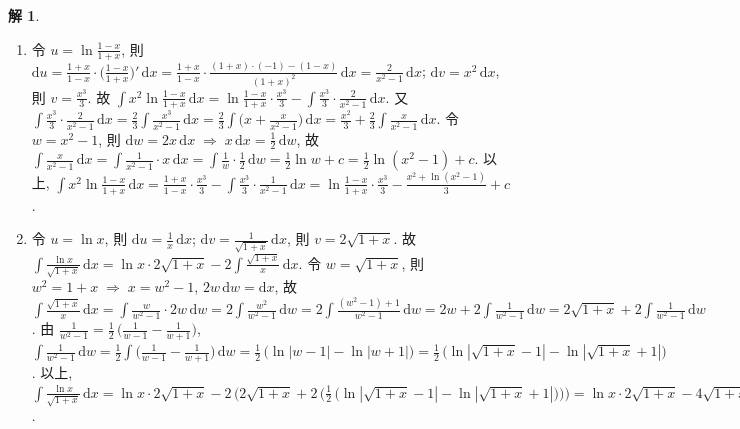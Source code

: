 \documentclass[12pt]{extarticle}
\newcommand{\ds}{\displaystyle}
\newcommand{\ie}{\;\Longrightarrow\;}
\theoremstyle{definition}
\newtheorem*{sol}{解}
\begin{document}
\begin{sol}
\begin{enumerate}
    \item 令 $\ds u = \ln\frac{1 - x}{1 + x}$, 則 $\ds\text{d}u = \frac{1 + x}{1 - x}\cdot\Big(\frac{1 - x}{1 + x}\Big)'\,\text{d}x = \frac{1 + x}{1 - x}\cdot\frac{(1 + x)\cdot(-1)-(1 - x)}{(1 + x)^2}\,\text{d}x = \frac{2}{x^2 - 1}\,\text{d}x$; $\ds\text{d}v = x^2\,\text{d}x$, 則 $\ds v = \frac{x^3}{3}$. 故 $\ds\int\!x^2\ln\frac{1 - x}{1 + x}\,\text{d}x = \ln\frac{1 - x}{1 + x}\cdot\frac{x^3}{3} - \int\frac{x^3}{3}\cdot\frac{2}{x^2 - 1}\,\text{d}x$. 又 $\ds\int\frac{x^3}{3}\cdot\frac{2}{x^2 - 1}\,\text{d}x = \frac{2}{3}\int\!\frac{x^3}{x^2 - 1}\,\text{d}x = \frac{2}{3}\int\!\Big(x + \frac{x}{x^2 - 1}\Big)\,\text{d}x = \frac{x^2}{3} + \frac{2}{3}\int\!\frac{x}{x^2 - 1}\,\text{d}x$. 令 $\ds w = x^2 - 1$, 則 $\ds\text{d}w = 2x\,\text{d}x\ie x\,\text{d}x = \frac{1}{2}\,\text{d}w$, 故 $\ds\int\!\frac{x}{x^2 - 1}\,\text{d}x = \int\!\frac{1}{x^2 - 1}\cdot x\,\text{d}x = \int\!\frac{1}{w}\cdot\frac{1}{2}\,\text{d}w = \frac{1}{2}\ln w + c = \frac{1}{2}\ln(x^2 - 1) + c$. 以上, $\ds\int x^2\ln\frac{1 - x}{1 + x}\,\text{d}x = \frac{1 + x}{1 - x}\cdot\frac{x^3}{3} - \int\!\frac{x^3}{3}\cdot\frac{1}{x^2 - 1}\,\text{d}x = \ln\frac{1 - x}{1 + x}\cdot\frac{x^3}{3} - \frac{x^2 + \ln(x^2 - 1)}{3} + c$. 
    \item 令 $\ds u = \ln x$, 則 $\ds\text{d}u = \frac{1}{x}\,\text{d}x$; $\ds\text{d}v = \frac{1}{\sqrt{1 + x}}\,\text{d}x$, 則 $\ds v = 2\sqrt{1 + x}$. 故 $\ds\int\!\frac{\ln x}{\sqrt{1 + x}}\,\text{d}x = \ln x\cdot 2\sqrt{1 + x} - 2 \int\!\frac{\sqrt{1 + x}}{x}\,\text{d}x$. 令 $\ds w = \sqrt{1 + x}$, 則 $\ds w^2 = 1 + x \ie x= w^2 - 1$, $\ds 2w\,\text{d}w = \text{d}x$, 故 $\ds\int\!\frac{\sqrt{1 + x}}{x}\,\text{d}x = \int\!\frac{w}{w^2 - 1}\cdot 2w\,\text{d}w = 2\int\!\frac{w^2}{w^2 - 1}\,\text{d}w = 2\int\!\frac{(w^2 - 1) + 1}{w^2 - 1}\,\text{d}w = 2 w + 2\int\!\frac{1}{w^2 - 1}\,\text{d}w = 2\sqrt{1 + x} + 2\int\!\frac{1}{w^2 -1}\,\text{d}w$. 由 $\ds\frac{1}{w^2 - 1} = \frac{1}{2}\,\bigg(\frac{1}{w - 1} - \frac{1}{w + 1}\bigg)$, $\ds\int\!\frac{1}{w^2 - 1}\,\text{d}w = \frac{1}{2}\int\!\Big(\frac{1}{w - 1} - \frac{1}{w + 1}\Big)\,\text{d}w =\frac{1}{2}\,\big(\ln|w - 1| - \ln|w + 1|\big) = \frac{1}{2}\,\big(\ln|\sqrt{1 + x} - 1| - \ln|\sqrt{1 + x} + 1|\big)$. 以上, $\ds\int\!\frac{\ln x}{\sqrt{1 + x}}\,\text{d}x = \ln x\cdot 2\sqrt{1 + x} - 2\,\big(2\sqrt{1+x} + 2\,\big(\frac{1}{2}\,\big(\ln|\sqrt{1 + x} - 1| - \ln|\sqrt{1 + x} + 1|\big)\big)\big) = \ln x\cdot 2\sqrt{1 + x} - 4\sqrt{1 + x} - 2\ln|\sqrt{1 + x} - 1| + 2\ln|\sqrt{1 + x} + 1| + c$. 
  \end{enumerate}
\end{sol}
\end{document}
